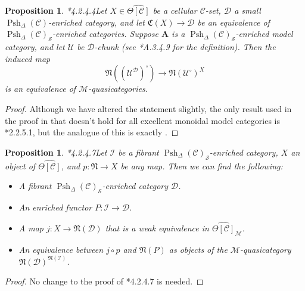 \documentclass[a4paper]{article}
\numberwithin{equation}{subsection}
\theoremstyle{plain}   %
\newtheorem{prop}[equation]{Proposition}
\theoremstyle{definition}
\theoremstyle{remark}
\theoremstyle{plain}
\providecommand{\C}{}
\renewcommand{\C}{\ensuremath{\mathcal{C}}}
\newcommand{\M}{\ensuremath{\mathcal{M}}}
\newcommand{\setS}{\ensuremath{\mathscr{S}}}
\newcommand{\cellset}{\ensuremath{\widehat{\Theta[\mathcal{C}]}}}
\newcommand{\spsh}{\ensuremath{\operatorname{Psh}_\Delta(\mathcal{C})}}
\begin{document}
\begin{prop}\cite{htt}*{4.2.4.4}\label{lurieprop1}
	Let \(X\in \cellset\) be a cellular \(\C\)-set, \(\mathcal{D}\) a small \(\spsh\)-enriched category, and let \(\mathfrak{C}(X)\to \mathcal{D}\) be an equivalence of \(\spsh_{\setS}\)-enriched categories. Suppose \(\mathbf{A}\) is a \(\spsh_{\setS}\)-enriched model category, and let \(\mathcal{U}\) be \(\mathcal{D}\)-chunk (see \cite{htt}*{A.3.4.9} for the definition).  Then the induced map
	\[\mathfrak{N}((\mathcal{U}^\mathcal{D})^\circ)\to \mathfrak{N}(\mathcal{U}^\circ)^X\] is an equivalence of \(\M\)-quasicategories.
\end{prop}
\begin{proof} Although we have altered the statement slightly, the only result used in the proof in \cite{htt} that doesn't hold for all excellent monoidal model categories is \cite{htt}*{2.2.5.1}, but the analogue of this is exactly .
\end{proof}
\begin{prop}\cite{htt}*{4.2.4.7}\label{lurieprop2}
	Let \(\mathcal{I}\) be a fibrant \(\spsh_{\setS}\)-enriched category, \(X\) an object of \(\cellset\), and \(p:\mathfrak{N}\to X\) be any map.  Then we can find the following:
	\begin{itemize}
		\item A fibrant \(\spsh_{\setS}\)-enriched category \(\mathcal{D}\).
		\item An enriched functor \(P:\mathcal{I}\to \mathcal{D}\).
		\item A map \(j:X\to \mathfrak{N}(\mathcal{D})\) that is a weak equivalence in \(\cellset_\mathcal{M}\).
		\item An equivalence between \(j\circ p\) and \(\mathfrak{N}(P)\) as objects of the \(\M\)-quasicategory \(\mathfrak{N}(\mathcal{D})^{\mathfrak{N}(\mathcal{I})}\).
	\end{itemize}
\end{prop}
\begin{proof} No change to the proof of \cite{htt}*{4.2.4.7} is needed.
\end{proof}
\end{document}
